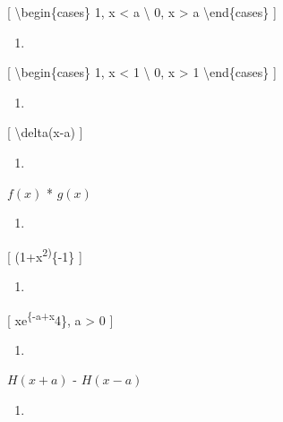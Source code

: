 \documentclass[
]{article}
\providecommand{\tightlist}{%
  \setlength{\itemsep}{0pt}\setlength{\parskip}{0pt}}
\begin{document}
{{[} \textbackslash begin\{cases\} 1, \textbar x\textbar{} \textless{} a
\textbackslash{} 0, \textbar x\textbar{} \textgreater{} a
\textbackslash end\{cases\} {]}

\begin{enumerate}
\def\labelenumi{\arabic{enumi}.}
\setcounter{enumi}{8}
\tightlist
\item
\end{enumerate}

{[} \textbackslash begin\{cases\} 1, \textbar x\textbar{} \textless{} 1
\textbackslash{} 0, \textbar x\textbar{} \textgreater{} 1
\textbackslash end\{cases\} {]}

\begin{enumerate}
\def\labelenumi{\arabic{enumi}.}
\setcounter{enumi}{9}
\tightlist
\item
\end{enumerate}

{[} \textbackslash delta(x-a) {]}

\begin{enumerate}
\def\labelenumi{\arabic{enumi}.}
\setcounter{enumi}{10}
\tightlist
\item
\end{enumerate}

\(f(x)\) * \(g(x)\)

\begin{enumerate}
\def\labelenumi{\arabic{enumi}.}
\setcounter{enumi}{11}
\tightlist
\item
\end{enumerate}

{[} (1+x\textsuperscript{2)}\{-1\} {]}

\begin{enumerate}
\def\labelenumi{\arabic{enumi}.}
\setcounter{enumi}{12}
\tightlist
\item
\end{enumerate}

{[} xe\textsuperscript{\{-a+x}4\}, a \textgreater{} 0 {]}

\begin{enumerate}
\def\labelenumi{\arabic{enumi}.}
\setcounter{enumi}{13}
\tightlist
\item
\end{enumerate}

\(H(x+a)\) - \(H(x-a)\)

\begin{enumerate}
\def\labelenumi{\arabic{enumi}.}
\setcounter{enumi}{14}
\tightlist
\item
\end{enumerate}

}
\end{document}
